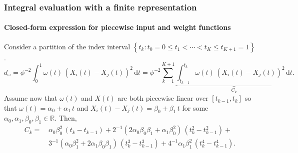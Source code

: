 \documentclass{snedecorbeamer}
\newcommand{\dt}{\, \mathrm{d}t}
\newcommand{\w}{\omega}
\begin{document}
\begin{frame}%
  \label{frm:integral-pcws}
  \frametitle{Integral evaluation with a finite representation}
  \framesubtitle{Closed-form expression for piecewise input and weight functions}

  Consider a partition of the index interval $\left\{ t_k: t_0 = 0 \le t_1 <
    \cdots < t_K \le t_{K+1} = 1 \right\}$.
  \begin{equation}
    \label{eq:01-adrd-integrand}
    d_{\omega}
    =\phi^{-2}\int_0^1 \w(t) \, {(X_i(t) - X_j(t))}^2 \dt
    =\phi^{-2}\sum_{k = 1}^{K + 1}
    \underbrace{
      \int_{t_{k-1}}^{t_k} \w(t) \, {(X_i(t) - X_j(t))}^2
      \dt}_{C_k}.
  \end{equation}
  Assume now that $\omega(t)$ and $X(t)$ are both piecewise linear over $[t_{k-1},
  t_{k}]$ so that $\omega(t) = \alpha_0 + \alpha_1 \, t$ and
  ${X_i(t) - X_j(t)} = \beta_0 + \beta_1 \, t$
  for some $\alpha_0, \alpha_1, \beta_0, \beta_1\in\mathbb{R}$.
  Then,
  \begin{equation}
    \label{eq:01-adrd-linweight-lininput}
    \begin{split}
      C_k=\,
      &
      \alpha_0\beta_0^2
      \,\left({t_{k} - t_{k-1}}\right)
      +
      2^{-1}
      \left(
        2\alpha_0\beta_0\beta_1 + \alpha_1\beta_0^2
      \right)
      \,\left({t^2_{k} - t^2_{k-1}}\right)
      + \\
      &3^{-1}
      \left(\alpha_0\beta_1^2 + 2\alpha_1\beta_0\beta_1\right)
      \,\left({t^3_{k} - t^3_{k-1}}\right)
      +
      4^{-1}
      \alpha_1\beta_1^2
      \,\left({t^4_{k} - t^4_{k-1}}\right).
    \end{split}
  \end{equation}
\end{frame}
\end{document}
